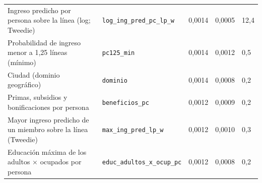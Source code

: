 \begin{table}[H]
{\begin{tabular}[t]{lllll}
Ingreso predicho por persona sobre la línea (log; Tweedie) & \texttt{log\_ing\_pred\_pc\_lp\_w} & 0,0014 & 0,0005 & 12,4\\
\addlinespace
Probabilidad de ingreso menor a 1,25 líneas (mínimo) & \texttt{pc125\_min} & 0,0014 & 0,0012 & 0,5\\
Ciudad (dominio geográfico) & \texttt{dominio} & 0,0014 & 0,0008 & 0,2\\
Primas, subsidios y bonificaciones por persona & \texttt{beneficios\_pc} & 0,0012 & 0,0009 & 0,2\\
Mayor ingreso predicho de un miembro sobre la línea (Tweedie) & \texttt{max\_ing\_pred\_lp\_w} & 0,0012 & 0,0010 & 0,3\\
Educación máxima de los adultos × ocupados por persona & \texttt{educ\_adultos\_x\_ocup\_pc} & 0,0012 & 0,0008 & 0,2\\
\bottomrule
\end{tabular}}
\end{table}
